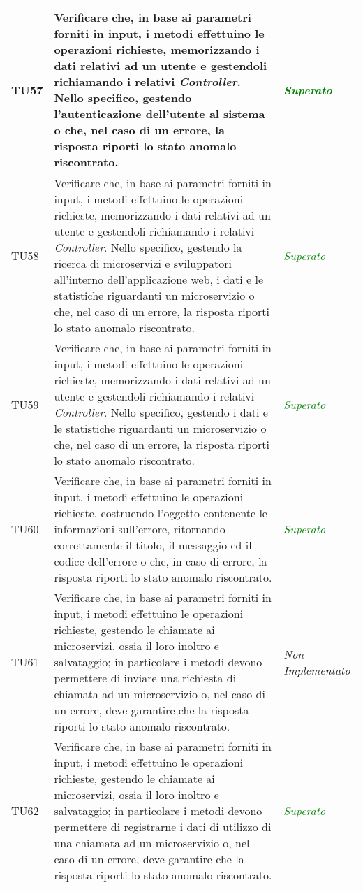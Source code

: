 \begin{longtable}{|>{\centering\arraybackslash}p{1.5cm}|>{\centering\arraybackslash}p{8cm} | >{\centering\arraybackslash}p{3.8cm}|}
		\hypertarget{TU57}{TU57} & Verificare che, in base ai parametri forniti in input, i metodi effettuino le operazioni richieste, memorizzando i dati relativi ad un utente e gestendoli richiamando i relativi \textit{Controller}. Nello specifico, gestendo l'autenticazione dell'utente al sistema o che, nel caso di un errore, la risposta riporti lo stato anomalo riscontrato. & \textcolor{Green}{\textit{Superato}}\\ \hline
		\hypertarget{TU58}{TU58} & Verificare che, in base ai parametri forniti in input, i metodi effettuino le operazioni richieste, memorizzando i dati relativi ad un utente e gestendoli richiamando i relativi \textit{Controller}. Nello specifico, gestendo la ricerca di microservizi e sviluppatori all'interno dell'applicazione web, i dati e le statistiche riguardanti un microservizio o che, nel caso di un errore, la risposta riporti lo stato anomalo riscontrato. & \textcolor{Green}{\textit{Superato}}\\ \hline
		\hypertarget{TU59}{TU59} & Verificare che, in base ai parametri forniti in input, i metodi effettuino le operazioni richieste, memorizzando i dati relativi ad un utente e gestendoli richiamando i relativi \textit{Controller}. Nello specifico, gestendo i dati e le statistiche riguardanti un microservizio o che, nel caso di un errore, la risposta riporti lo stato anomalo riscontrato. & \textcolor{Green}{\textit{Superato}}\\ \hline
		\hypertarget{TU60}{TU60} & Verificare che, in base ai parametri forniti in input, i metodi effettuino le operazioni richieste, costruendo l’oggetto contenente le informazioni sull'errore, ritornando correttamente il titolo, il messaggio ed il codice dell’errore o che, in caso di errore, la risposta riporti lo stato anomalo riscontrato. & \textcolor{Green}{\textit{Superato}}\\ \hline
		\hypertarget{TU61}{TU61} & Verificare che, in base ai parametri forniti in input, i metodi effettuino le operazioni richieste, gestendo le chiamate ai microservizi, ossia il loro inoltro e salvataggio; in particolare i metodi devono permettere di inviare una richiesta di chiamata ad un microservizio o, nel caso di un errore, deve garantire che la risposta riporti lo stato anomalo riscontrato. & \textit{Non Implementato}\\ \hline
		\hypertarget{TU62}{TU62} & Verificare che, in base ai parametri forniti in input, i metodi effettuino le operazioni richieste, gestendo le chiamate ai microservizi, ossia il loro inoltro e salvataggio; in particolare i metodi devono permettere di registrarne i dati di utilizzo di una chiamata ad un microservizio o, nel caso di un errore, deve garantire che la risposta riporti lo stato anomalo riscontrato. & \textcolor{Green}{\textit{Superato}}\\ \hline

\end{longtable}
